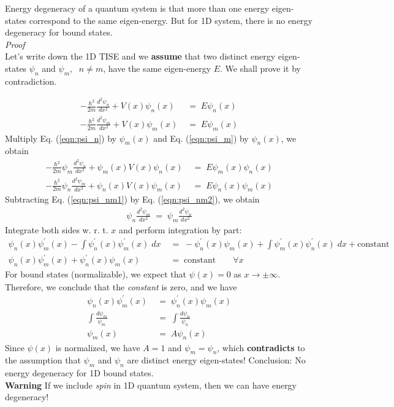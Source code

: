 \documentclass[12pt,a4paper]{article}
\begin{document}
Energy degeneracy of a quantum system is that more than one energy eigen-states correspond to the same eigen-energy. But for 1D system, there is no energy degeneracy for bound states.\\

\textit{Proof}\\
Let's write down the 1D TISE and we \textbf{assume} that two distinct energy eigen-states $\psi_{n}$ and $\psi_{m}, \;$ $n \neq m$, have the same eigen-energy $E$. We shall prove it by contradiction.

\begin{align}
	-\frac{\hbar^{2}}{2m} \frac{d^{2} \psi_{n}}{dx^{2}} + V(x) \psi_{n}(x) \; &= \; E \psi_{n}(x) \label{eqn:psi_n} \\
	-\frac{\hbar^{2}}{2m} \frac{d^{2} \psi_{m}}{dx^{2}} + V(x) \psi_{m}(x) \; &= \; E \psi_{m}(x) \label{eqn:psi_m}
\end{align}
Multiply Eq. (\ref{eqn:psi_n}) by $\psi_{m}(x)$ and Eq. (\ref{eqn:psi_m}) by $\psi_{n}(x)$, we obtain
\begin{align}
-\frac{\hbar^{2}}{2m} \psi_{m} \frac{d^{2} \psi_{n}}{dx^{2}} + \psi_{m}(x) V(x)\psi_{n}(x) \; &= \; E \psi_{m}(x) \psi_{n}(x) \label{eqn:psi_nm1} \\
-\frac{\hbar^{2}}{2m} \psi_{n} \frac{d^{2} \psi_{m}}{dx^{2}} + \psi_{n}(x) V(x) \psi_{m}(x) \; &= \; E \psi_{n}(x) \psi_{m}(x) \label{eqn:psi_nm2}
\end{align}
Subtracting Eq. (\ref{eqn:psi_nm1}) by Eq. (\ref{eqn:psi_nm2}), we obtain
\begin{align}
	\psi_{n} \frac{d^{2} \psi_{m}}{dx^{2}} \; = \; 
	\psi_{m} \frac{d^{2} \psi_{n}}{dx^{2}}
\end{align}
Integrate both sides w. r. t. $x$ and perform integration by part:
\begin{align}
	\psi_{n}(x) \psi_{m}^{\prime}(x) - \int \psi_{n}^{\prime}(x)  \psi_{m}^{\prime}(x) \; dx
	\; &= \;
	-\psi_{n}^{\prime}(x) \psi_{m}(x)  + \int \psi_{m}^{\prime}(x)  \psi_{n}^{\prime}(x) \; dx  + \mathrm{constant}\\
	\psi_{n}(x) \psi_{m}^{\prime}(x)  + \psi_{n}^{\prime}(x) \psi_{m}(x) \; &= \;  \mathrm{constant} \qquad \forall x
\end{align}
For bound states (normalizable), we expect that $\psi_{}(x) = 0$ as $x \to \pm \infty$. Therefore, we conclude that the \textit{constant} is zero, and we have
\begin{align}
	\psi_{n}(x) \psi_{m}^{\prime}(x)  \; &= \; \psi_{n}^{\prime}(x) \psi_{m}(x) \\
	\int \frac{d \psi_{m}}{\psi_{m}} \; &= \; \int \frac{d \psi_{n}}{\psi_{n}} \\
	\psi_{m}(x) \; &= \; A \psi_{n}(x)
\end{align}
Since $\psi(x)$ is normalized, we have $A = 1$ and $\psi_{m} = \psi_{n}$, which \textbf{contradicts} to the assumption that $\psi_{m}$ and $\psi_{n}$ are distinct energy eigen-states! Conclusion: No energy degeneracy for 1D bound states.\\

\textbf{Warning}
If we include \textit{spin} in 1D quantum system, then we can have energy degeneracy!
\end{document}
